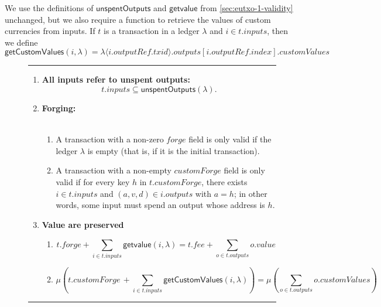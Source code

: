 \documentclass[a4paper]{article}
\newcommand{\s}{\textsf}  %
\theoremstyle{definition}  %
\newcommand\rfskip{7pt}
\newenvironment{ruledfigure}[1]{\begin{figure}[#1]\hrule\vspace{\rfskip}}{\vspace{\rfskip}\hrule\end{figure}}
\newcommand{\mi}[1]{\ensuremath{\mathit{#1}}}
\newcommand{\txid}{\mi{txid}}
\newcommand{\idx}{\mi{index}}
\newcommand{\inputs}{\mi{inputs}}
\newcommand{\outputs}{\mi{outputs}}
\newcommand{\forge}{\mi{forge}}
\newcommand{\fee}{\mi{fee}}
\newcommand{\val}{\mi{value}}  %
\newcommand{\customvals}{\mi{customValues}}
\newcommand{\customforge}{\mi{customForge}}
\newcommand{\outputref}{\mi{outputRef}}
\newcommand{\getvalue}{\msf{getvalue}}
\newcommand{\msf}[1]{\ensuremath{\mathsf{#1}}}
\newcommand{\unspent}{\msf{unspentOutputs}}
\begin{document}
We use the definitions of \unspent{}  and
\getvalue{} from \cref{sec:eutxo-1-validity} unchanged,
but we also require a function to retrieve the values of
custom currencies from inputs. If $t$ is a transaction in a ledger
$\lambda$ and $i \in t.\inputs$, then we define
$$
\s{getCustomValues}(i,\lambda) = \lambda\langle i.\outputref.\txid
\rangle.\outputs[i.\outputref.\idx].\customvals
$$


\begin{ruledfigure}{H}
  \begin{enumerate}
    \item \label{rule:all-inputs-refer-to-unspent-outputs-2} \textbf{All
      inputs refer to unspent outputs:}
      \[
        t.\inputs \subseteq \unspent(\lambda).
      \]
    \item\textbf{Forging:}\\\\
      \begin{minipage}{0.85\textwidth}
          \begin{enumerate}
          \item
              A transaction with a non-zero \forge{} field is only
            valid if the ledger $\lambda$ is empty
            (that is, if it is the initial
            transaction).
          \item \label{rule:custom-forge}
            A transaction with a non-empty \customforge{} field is
            only valid if for every key $h$ in $t.\customforge$, there
            exists $i \in t.\inputs$ and $(a,v,d) \in i.\outputs$ with
            $a =h$; in other words, some input must spend an output
            whose address is $h$.
          \end{enumerate}
          \end{minipage}
    \item \textbf{Value are preserved}\\
      \begin{minipage}{0.85\textwidth}
          \begin{enumerate}
          \item\label{rule:native-value-is-preserved-2}
            \[
            t.\forge + \sum_{i \in t.\inputs} \getvalue(i, \lambda) = t.\fee + \sum_{o \in t.\outputs} o.\val
            \]

          \item\label{rule:custom-values-are-preserved-2}
            \[
              \mu\left(t.\customforge\, + \sum_{i \in t.\inputs} \s{getCustomValues}(i, \lambda)\right) =
              \mu\left(\sum_{o \in t.\outputs} o.\customvals\right)
            \]
          \end{enumerate}


\end{minipage}
\end{enumerate}
\end{ruledfigure}
\end{document}
